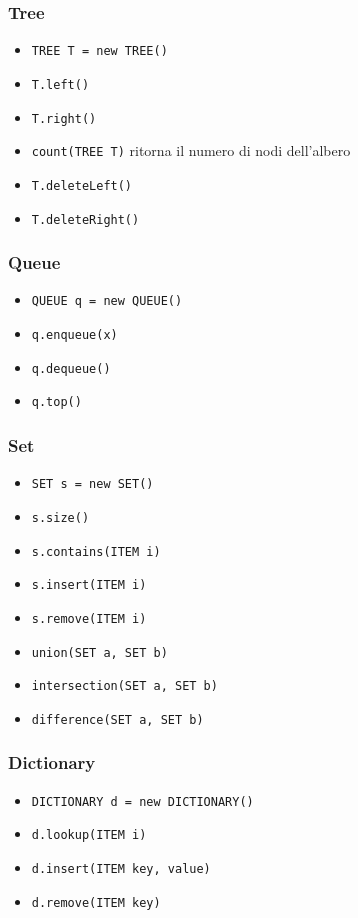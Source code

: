 \begin{minipage}[t]{0.48\textwidth}
  \subsubsection*{Tree}
  \begin{itemize}
    \item \verb|TREE T = new TREE()|
    \item \verb|T.left()|
    \item \verb|T.right()|
    \item \verb|count(TREE T)| ritorna il numero di nodi dell'albero
    \item \verb|T.deleteLeft()|
    \item \verb|T.deleteRight()|
  \end{itemize}
\end{minipage}
%
\begin{minipage}[t]{0.48\textwidth}
  \subsubsection*{Queue}
  \begin{itemize}
    \item \verb|QUEUE q = new QUEUE()| %
    \item \verb|q.enqueue(x)| %
    \item \verb|q.dequeue()| %
    \item \verb|q.top()| %
  \end{itemize}
  \vskip3mm
  \subsubsection*{Set} 
 \begin{itemize}
    \item \verb|SET s = new SET()|
    \item \verb|s.size()|
    \item \verb|s.contains(ITEM i)|
    \item \verb|s.insert(ITEM i)|
    \item \verb|s.remove(ITEM i)|
    \item \verb|union(SET a, SET b)|
    \item \verb|intersection(SET a, SET b)|
    \item \verb|difference(SET a, SET b)|
 \end{itemize}

  \subsubsection*{Dictionary}
  \begin{itemize}
    \item \verb|DICTIONARY d = new DICTIONARY()|
    \item \verb|d.lookup(ITEM i)|
    \item \verb|d.insert(ITEM key, value)|
    \item \verb|d.remove(ITEM key)|
  \end{itemize}

\end{minipage}
\newpage  


